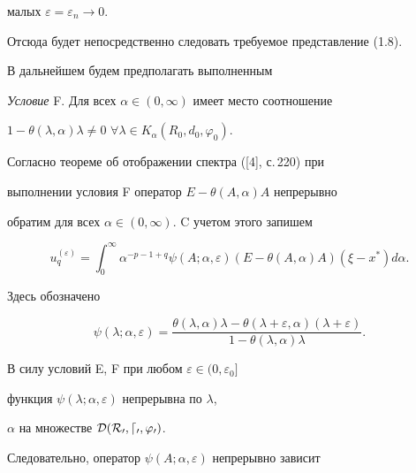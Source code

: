 малых $\varepsilon=\varepsilon_n\to0$.


Отсюда будет непосредственно следовать требуемое представление (1.8).





В дальнейшем будем предполагать выполненным


\medskip





{\it Условие} F. Для всех $\alpha\in(0,\infty)$ имеет место соотношение 


$1-\theta(\lambda,\alpha)\lambda\ne0$\; $\forall\lambda\in 


K_\alpha(R_0,d_0,\varphi_0)$.





Согласно теореме об отображении спектра ([4], с.\,220) при 


выполнении условия F оператор $E-\theta(A,\alpha)A$ непрерывно 


обратим для всех $\alpha\in(0,\infty)$. C учетом этого запишем


\begin{equation}


u^{(\varepsilon)}_q=\int^\infty_0 \alpha^{-p-1+q}


\psi(A;\alpha,\varepsilon)(E-\theta(A,\alpha)A)


(\xi-x^*)d\alpha.


\end{equation}


Здесь обозначено


\begin{equation}


\psi(\lambda;\alpha,\varepsilon)=


\frac{\theta(\lambda,\alpha)\lambda- \theta(\lambda+\varepsilon,\alpha) 


(\lambda+\varepsilon)}


{1-\theta(\lambda,\alpha)\lambda}.


\end{equation}


В силу условий E, F при любом $\varepsilon\in (0,\varepsilon_0]$


функция $\psi(\lambda;\alpha,\varepsilon)$ непрерывна по $\lambda$, 


$\alpha$ на множестве $\cal D(R_0,d_0,\varphi_0)$.


Следовательно, оператор $\psi(A;\alpha,\varepsilon)$ непрерывно зависит 


